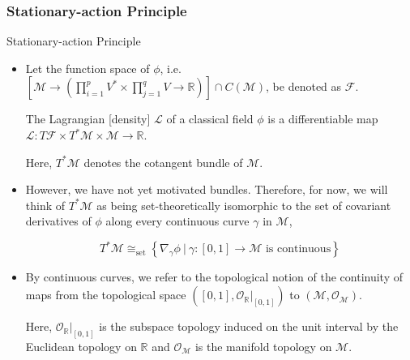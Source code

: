 \documentclass[9pt,handout]{beamer}
\begin{document}
\subsubsection{Stationary-action Principle}
\begin{frame}{Stationary-action Principle}
\begin{itemize}
\item Let the function space of $\phi$, i.e. $\displaystyle{\left[ \mathcal{M} \to \left( \prod_{i=1}^{p} V^* \times \prod_{j=1}^q V \to \mathbb{R} \right) \right] \cap C \left( \mathcal{M} \right)}$, be denoted as $\mathcal{F}$.

\begin{definition}[Lagrangian]
The Lagrangian [density] $\mathcal{L}$ of a classical field $\phi$ is a differentiable map $\mathcal{L} : T \mathcal{F} \times T^* \mathcal{M} \times \mathcal{M} \to \mathbb{R}$.
\end{definition}

Here, $T^* \mathcal{M}$ denotes the cotangent bundle of $\mathcal{M}$.

\item However, we have not yet motivated bundles. Therefore, for now, we will think of $T^* \mathcal{M}$ as being set-theoretically isomorphic to the set of covariant derivatives of $\phi$ along every continuous curve $\gamma$ in $\mathcal{M}$,

$$T^* \mathcal{M} \cong_{\text{set}} \left\{ \nabla_\gamma \phi \: \vert \: \gamma : \left[ 0, 1 \right] \to \mathcal{M} \text{ is continuous} \right\}$$

\item By continuous curves, we refer to the topological notion of the continuity of maps from the topological space $\left( \left[ 0, 1 \right], \mathcal{O}_{\mathbb{R}} \big\vert_{\left[ 0, 1 \right]} \right)$ to $\left( \mathcal{M}, \mathcal{O}_{\mathcal{M}} \right)$.

Here, $\mathcal{O}_{\mathbb{R}} \big\vert_{\left[ 0, 1 \right]}$ is the subspace topology induced on the unit interval by the Euclidean topology on $\mathbb{R}$ and $\mathcal{O}_{\mathcal{M}}$ is the manifold topology on $\mathcal{M}$.

\end{itemize}
\end{frame}
\end{document}
